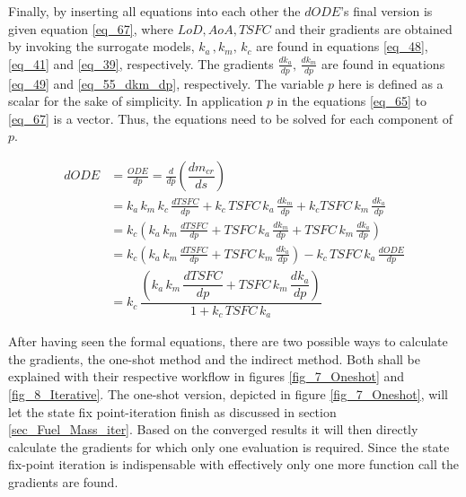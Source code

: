 Finally, by inserting all equations into each 
other the $dODE$'s final version is given 
equation \eqref{eq_67}, where $LoD, AoA, TSFC$
and their gradients are obtained by invoking 
the surrogate models, $k_a \, ,k_m ,\, k_c$
are found in equations \eqref{eq_48}, \eqref{eq_41} and 
\eqref{eq_39}, respectively. The gradients 
$\frac{dk_a}{dp}, \, \frac{dk_m}{dp}$
are found in equations \eqref{eq_49} and \eqref{eq_55_dkm_dp}, 
respectively. The variable $p$ here is defined 
as a scalar for the sake of simplicity. In application 
$p$  in the equations \eqref{eq_65} to \eqref{eq_67} is  
a vector. Thus, the equations 
need to be solved for each component 
of $p$.


\begin{equation}
    \label{eq_67}
    \begin{aligned}
        dODE &= \frac{ODE}{dp} = \frac{d}{dp}\left(\dfrac{dm_{cr}}{ds}\right)\\
        &= k_a \, k_m \, k_c \, \frac{dTSFC}{dp} +k_c \, TSFC \, k_a \, 
        \frac{dk_m}{dp} +k_c  TSFC \, k_m \, \frac{dk_a}{dp} \\
        &= k_c \left(k_a \, k_m \, \frac{dTSFC}{dp}+ 
        TSFC \, k_a \, \frac{dk_m}{dp} + TSFC \, k_m \, 
        \frac{dk_a}{dp}\right)\\
        &= k_c \left(k_a \, k_m \, \frac{dTSFC}{dp}+ TSFC \, k_m \, 
        \frac{dk_a}{dp}\right) - k_c \, TSFC \, k_a \, \frac{dODE}{dp} \\
        &=  k_c\, \dfrac{\left(k_a \, k_m \, \dfrac{dTSFC}{dp}  + TSFC \, k_m \,
         \dfrac{dk_a}{dp}\right)}
        {1+ k_c \, TSFC \, k_a}
    \end{aligned}
\end{equation}

After having seen the formal equations, there are 
two possible ways to calculate the gradients,
the one-shot method and the indirect method.
Both shall be explained with their respective 
workflow in figures \ref{fig_7_Oneshot} and 
\ref{fig_8_Iterative}. 
The one-shot version, depicted in figure 
\ref{fig_7_Oneshot}, will let 
the state fix point-iteration finish as 
discussed in section \ref{sec_Fuel_Mass_iter}.
Based on the converged results it 
will then directly calculate the gradients 
for which only one evaluation is required. Since 
the state fix-point iteration is indispensable
with effectively only one more function call the 
gradients are found. \newline


